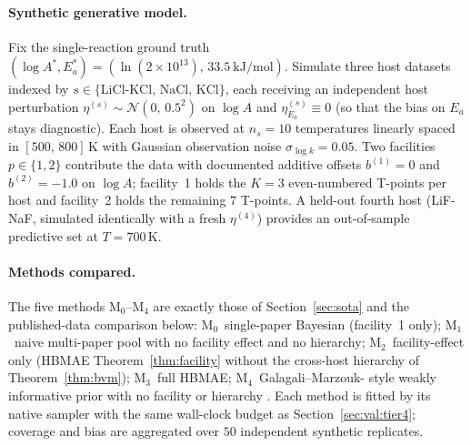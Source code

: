 \documentclass[12pt]{article}
\theoremstyle{plain}
\theoremstyle{definition}
\theoremstyle{remark}
\newcommand{\HBMAE}{HBMAE\xspace}
\begin{document}
\paragraph{Synthetic generative model.}
Fix the single-reaction ground truth
$(\log A^*, E_a^*) = (\ln(2\times 10^{13}),\,33.5\ \mathrm{kJ/mol})$.
Simulate three host datasets indexed by $s\in\{\mathrm{LiCl\text{-}KCl},\,
\mathrm{NaCl},\,\mathrm{KCl}\}$, each receiving an independent host
perturbation
$\eta^{(s)} \sim \mathcal{N}(0,\,0.5^2)$ on $\log A$ and
$\eta^{(s)}_{E_a}\equiv 0$ (so that the bias on $E_a$ stays diagnostic).
Each host is observed at $n_s = 10$ temperatures linearly spaced in
$[500,\,800]\,\mathrm{K}$ with Gaussian observation noise
$\sigma_{\log k}=0.05$.  Two facilities $p\in\{1,2\}$ contribute the
data with documented additive offsets $b^{(1)}=0$ and
$b^{(2)}=-1.0$ on $\log A$; facility~1 holds the $K=3$ even-numbered
T-points per host and facility~2 holds the remaining $7$ T-points.  A
held-out fourth host (LiF-NaF, simulated identically with a fresh
$\eta^{(4)}$) provides an out-of-sample predictive set at
$T = 700\,\mathrm{K}$.

\paragraph{Methods compared.}
The five methods M$_0$--M$_4$ are exactly those of
Section~\ref{sec:sota} and the published-data comparison below:
M$_0$~single-paper Bayesian (facility~1 only); M$_1$~naive multi-paper
pool with no facility effect and no hierarchy; M$_2$~facility-effect
only (HBMAE Theorem~\ref{thm:facility} without the cross-host hierarchy
of Theorem~\ref{thm:bvm}); M$_3$~full \HBMAE; M$_4$~Galagali--Marzouk-
style weakly informative prior with no facility or hierarchy
\citep{GalagaliMarzouk2015}.  Each method is fitted by its native sampler with
the same wall-clock budget as Section~\ref{sec:val:tier4}; coverage and
bias are aggregated over $50$ independent synthetic replicates.
\end{document}
